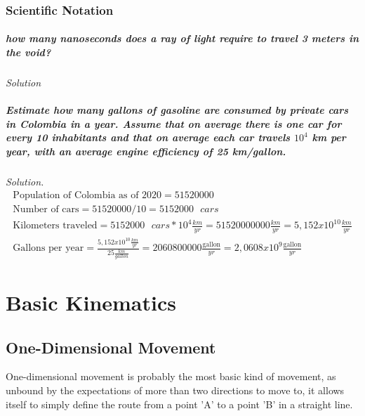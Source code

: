 \documentclass[11pt,fleqn]{book} %
\begin{document}
\subsection{Scientific Notation}
\paragraph{how many nanoseconds does a ray of light require to travel 3 meters in the void?}

\textit{Solution}


\paragraph{Estimate how many gallons of gasoline are consumed by private cars in Colombia in a year.
Assume that on average there is one car for every 10 inhabitants and that on average each car travels $10^4$ km per year, with an average engine efficiency of 25 km/gallon.}

\indent \textit{Solution.}
\begin{gather}
    \text{Population of Colombia as of 2020}= 51520000 \\
    \text{Number of cars}= 51520000/10 = 5152000 \text{ } cars\\
    \text{Kilometers traveled}=5152000 \text{ } cars * 10^4 \frac{km}{yr} = 51520000000\frac{km}{yr} = 5,152x10^{10}\frac{km}{yr}\\
    \text{Gallons per year}= \frac{5,152x10^{10}\frac{km}{yr}}{25\frac{km}{gallon}}=2060800000\frac{\text{gallon}}{yr} = 2,0608x10^{9}\frac{\text{gallon}}{yr}
\end{gather}



\chapter{Basic Kinematics}

\section{One-Dimensional Movement}
One-dimensional movement is probably the most basic kind of movement, as unbound by the expectations of 
more than two directions to move to, it allows itself to simply define the route from a point 'A' to a 
point 'B' in a straight line. 
\end{document}
